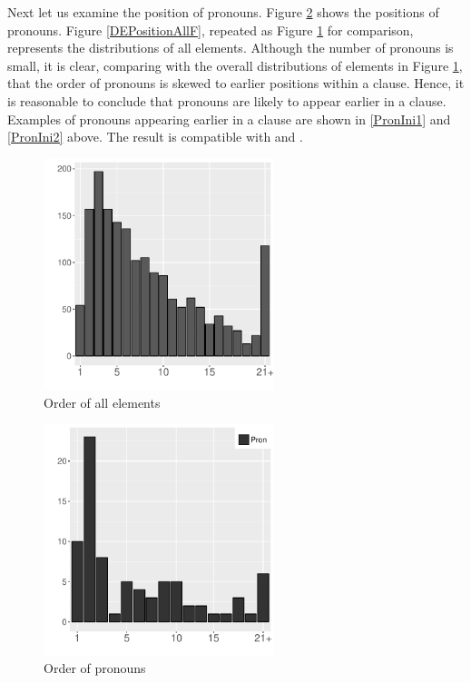 Next let us examine the position of pronouns.
Figure \ref{WOExpTypeF} shows the positions of pronouns.
Figure \ref{DEPositionAllF}, repeated as Figure \ref{DEPositionAllF2} for comparison,
represents the distributions of all elements.
Although the number of pronouns is small,
it is clear, comparing with the overall distributions of elements in Figure \ref{DEPositionAllF2}, that
the order of pronouns is skewed to earlier positions within a clause.
Hence, it is reasonable to conclude that
pronouns are likely to appear earlier in a clause.
Examples of pronouns appearing earlier in a clause are shown in \ref{PronIni1} and \ref{PronIni2} above.
The result is compatible with  and .


\begin{figure}
	\begin{center}
	\includegraphics[width=0.6\textwidth]{figure/DEPositionAll.pdf}
	\caption{Order of all elements}
	\label{DEPositionAllF2}
	\end{center}
\end{figure}
\begin{figure}
	\begin{center}
	\includegraphics[width=0.6\textwidth]{figure/WOExpType.pdf}
	\caption{Order of pronouns}
	\label{WOExpTypeF}
	\end{center}
\end{figure}

